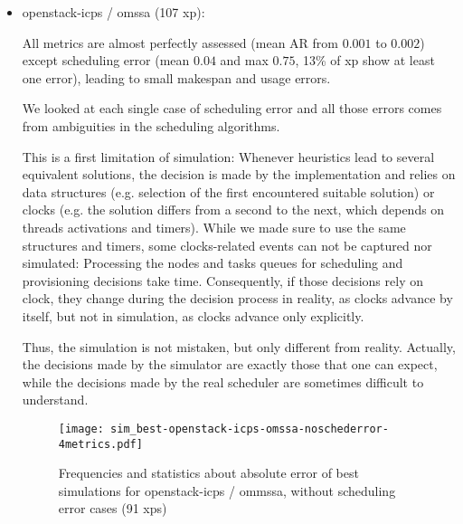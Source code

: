 \documentclass[a4paper,10pt]{article}
\newcommand\vrpath{../../lab/setup/simschlouder/validation-results/}
\begin{document}
\begin{itemize}
 \item openstack-icps / omssa (107 xp): 
 
      
 
      All metrics are almost perfectly assessed (mean AR from $0.001$ to $0.002$)
      except scheduling error 
      (mean $0.04$ and max $0.75$, 13\% of xp show at least one error), 
      leading to small makespan and usage errors. 
      
      We looked at each single case of scheduling error and all those errors 
      comes from ambiguities in the scheduling algorithms.
      
      This is a first limitation of simulation:
      Whenever heuristics lead to several equivalent solutions, 
      the decision is made by the implementation and relies on data structures 
      (e.g. selection of the first encountered suitable solution) or clocks 
      (e.g. the solution differs from a second to the next, which depends 
      on threads activations and timers). While we made sure to use the same 
      structures and timers, some clocks-related events can not be captured nor 
      simulated: Processing the nodes and tasks queues for scheduling and 
      provisioning decisions take time. Consequently, if those decisions rely on
      clock, they change during the decision process in reality, as clocks advance 
      by itself, but not in simulation, as clocks advance only explicitly.
      
      Thus, the simulation is not mistaken, but only different from reality.
      Actually, the decisions made by the simulator are exactly those that one 
      can expect, while the decisions made by the real scheduler are sometimes
      difficult to understand.

      
\begin{figure}  
  \texttt{[image: sim\_best-openstack-icps-omssa-noschederror-4metrics.pdf]}

  
      
  

\caption{Frequencies and statistics about absolute error of best simulations for openstack-icps / 
ommssa, without scheduling error cases (91 xps)}
\end{figure}       


\end{itemize}
\end{document}
